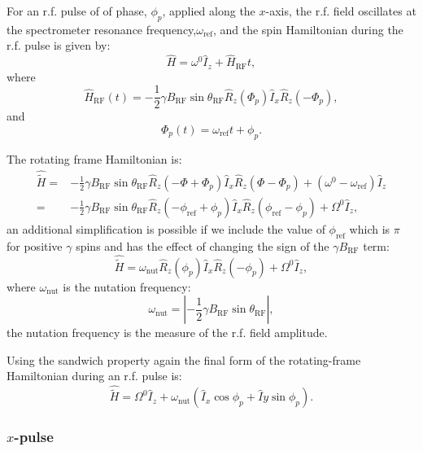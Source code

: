 For an r.f. pulse of of phase, $\phi_p$, applied along the $x$-axis, the r.f. field oscillates at the spectrometer resonance frequency,$\omega_{\text{ref}}$, and  the spin Hamiltonian
during the r.f. pulse is given by:
\begin{equation}
  \hat{H} = \omega^0\hat{I}_z + \hat{H}_{\text{RF}}{t},
\end{equation}
where
\begin{equation}
  \hat{H}_{\text{RF}}(t) = -\frac{1}{2}\gamma{B_{\text{RF}}}\sin{\theta_{\text{RF}}}\hat{R}_z(\Phi_p)\hat{I}_x\hat{R}_z(-\Phi_p),
\end{equation}
and
\begin{equation}
  \Phi_p(t) = \omega_{\text{ref}}t + \phi_p.
\end{equation}

The rotating frame Hamiltonian is:
\begin{align}
  \hat{\tilde{H}} =& -\frac{1}{2}\gamma{B_{\text{RF}}}\sin{\theta_{\text{RF}}}\hat{R}_z(-\Phi  +  \Phi_p)\hat{I}_x\hat{R}_z(\Phi-\Phi_p) + (\omega^0 - \omega_\text{ref})\hat{I}_z \\
  =& -\frac{1}{2}\gamma{B_{\text{RF}}}\sin{\theta_{\text{RF}}}\hat{R}_z(-\phi_{\text{ref}}  +  \phi_p)\hat{I}_x\hat{R}_z(\phi_{\text{ref}}-\phi_p) + \Omega^0\hat{I}_z,
\end{align}
an additional simplification is possible if we include the value of $\phi_{\text{ref}}$ which is
$\pi$ for positive $\gamma$ spins and has the effect of changing the sign of the $\gamma{B_{\text{RF}}}$
term:
\begin{equation}
  \hat{\tilde{H}} = \omega_{\text{nut}}\hat{R}_z(\phi_p)\hat{I}_x\hat{R}_z(-\phi_p) + \Omega^0\hat{I}_z,
\end{equation}
where $\omega_{\text{nut}}$ is the nutation frequency:
\begin{equation}
  \omega_{\text{nut}} = |-\frac{1}{2}\gamma{B_{\text{RF}}}\sin{\theta_{\text{RF}}}|,
\end{equation}
the nutation frequency is the measure of the r.f. field amplitude.

Using the sandwich property again the final form of the rotating-frame Hamiltonian during an r.f. pulse
is:
\begin{equation}
  \hat{\tilde{H}} = \Omega^0\hat{I}_z + \omega_{\text{nut}}(\hat{I}_x\cos\phi_p + \hat{I}y\sin\phi_p).
\end{equation}


\subsubsection{$x$-pulse}

